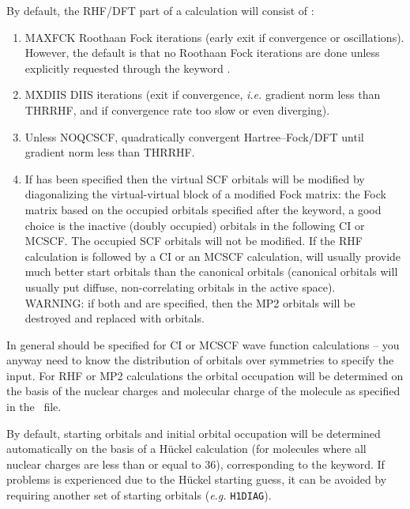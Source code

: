 By default, the RHF/DFT part of a calculation will consist of :
\begin{enumerate}
\item {MAXFCK Roothaan Fock iterations (early exit if convergence
    or oscillations). However, the default is that no Roothaan Fock
iterations are done unless explicitly requested through the keyword
.
}
\item {MXDIIS DIIS iterations (exit if convergence, {\it i.e.\/} gradient norm
    less than THRRHF, and if convergence rate too slow or even diverging).
}
\item {Unless NOQCSCF, quadratically convergent Hartree--Fock/DFT until
    gradient norm less than THRRHF.
}
\item{If  has been specified
    then the virtual SCF orbitals will be modified by diagonalizing
    the virtual-virtual block of
    a modified Fock matrix: the Fock matrix
    based on the occupied orbitals specified after the keyword, a
    good choice is the inactive (doubly occupied) orbitals in the
    following CI or MCSCF.
    The occupied SCF orbitals will not be modified.
    If the RHF calculation is followed by a CI or an MCSCF calculation,
     will usually provide much
    better start orbitals than the canonical orbitals (canonical
    orbitals will usually put diffuse, non-correlating orbitals in the
    active space). \\
    WARNING: if both  and  are specified,
    then the MP2 orbitals will be destroyed and replaced with 
    orbitals.
}
\end{enumerate}

In general  should be specified for CI or MCSCF
wave function calculations -- you anyway need to know the distribution
of orbitals over symmetries to specify the  input.
For RHF
or MP2
calculations the orbital occupation will be determined on the
basis of the nuclear charges and molecular charge of the molecule as
specified in the \molinp\ file.

By default, starting orbitals and initial orbital occupation will
be determined automatically on the basis of a H\"{u}ckel
calculation (for molecules where all nuclear charges are
less than or equal to 36), corresponding to the  keyword.
If problems is experienced due to the
H\"{u}ckel starting guess, it can be avoided by requiring another set of
starting orbitals ({\it e.g.\/} \verb|H1DIAG|).

